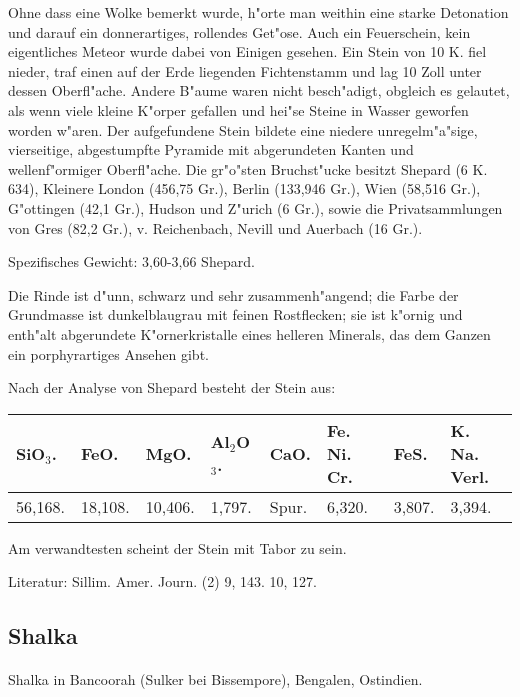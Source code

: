\documentclass[a4paper, 11pt, oneside]{article}
\begin{document}
Ohne dass eine Wolke bemerkt wurde, h"orte man weithin eine starke Detonation und darauf ein donnerartiges, rollendes Get"ose. Auch ein Feuerschein, kein eigentliches Meteor wurde dabei von Einigen gesehen. Ein Stein von 10 K. fiel nieder, traf einen auf der Erde liegenden Fichtenstamm und lag 10 Zoll unter dessen Oberfl"ache. Andere B"aume waren nicht besch"adigt, obgleich es gelautet, als wenn viele kleine K"orper gefallen und hei"se Steine in Wasser geworfen worden w"aren. Der aufgefundene Stein bildete eine niedere unregelm"a"sige, vierseitige, abgestumpfte Pyramide mit abgerundeten Kanten und wellenf"ormiger Oberfl"ache. Die gr"o"sten Bruchst"ucke besitzt Shepard (6 K. 634), Kleinere London (456,75 Gr.), Berlin (133,946 Gr.), Wien (58,516 Gr.), G"ottingen (42,1 Gr.), Hudson und Z"urich (6 Gr.), sowie die Privatsammlungen von Gres (82,2 Gr.), v. Reichenbach, Nevill und Auerbach (16 Gr.).

Spezifisches Gewicht: 3,60-3,66 Shepard.

Die Rinde ist d"unn, schwarz und sehr zusammenh"angend; die Farbe der Grundmasse ist dunkelblaugrau mit feinen Rostflecken; sie ist k"ornig und enth"alt abgerundete K"ornerkristalle eines helleren Minerals, das dem Ganzen ein porphyrartiges Ansehen gibt.

Nach der Analyse von Shepard besteht der Stein aus:
\begin{table}[!ht]
    \centering
    \footnotesize
    \begin{tabular}{l l l l l l l l}
        SiO$_{3}$. & FeO. & MgO. & Al$_{2}$O$_{3}$. & CaO. & Fe. Ni. Cr. & FeS. & K. Na. Verl.  \\ \hline
        56,168. & 18,108. & 10,406. & 1,797. & Spur. & 6,320. & 3,807. & 3,394. \\
    \end{tabular}
\end{table}

Am verwandtesten scheint der Stein mit Tabor zu sein.

\footnotesize
Literatur: Sillim. Amer. Journ. (2) 9, 143. 10, 127.

\subsection{Shalka}
\normalsize
\paragraph{}
Shalka in Bancoorah (Sulker bei Bissempore), Bengalen, Ostindien.
\end{document}
